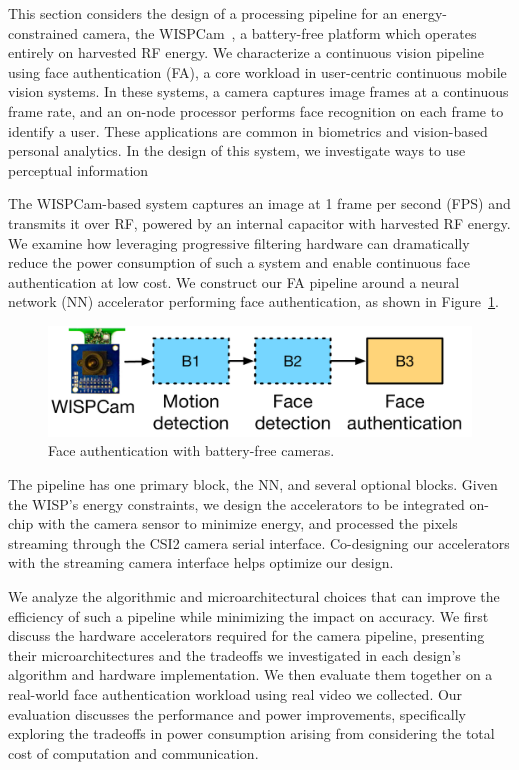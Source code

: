 
\label{sec:nsp-face-auth}

This section considers the design of a processing pipeline for an energy-constrained camera, the WISPCam~\cite{wispcam}, a battery-free platform which operates entirely on harvested RF energy.
We characterize a continuous vision pipeline using face authentication (FA), a core workload in user-centric continuous mobile vision systems.
In these systems, a camera captures image frames at a continuous frame rate, and an on-node processor performs face recognition on each frame to identify a user.
These applications are common in biometrics and vision-based personal analytics.
In the design of this system, we investigate ways to use perceptual information


The WISPCam-based system captures an image at 1 frame per second (FPS) and transmits it over RF, powered by an internal capacitor with harvested RF energy.
We examine how leveraging progressive filtering hardware can dramatically reduce the power consumption of such a system and enable continuous face authentication at low cost.
We construct our FA pipeline around a neural network (NN) accelerator performing face authentication, as shown in Figure~\ref{fig:face_recog_pipeline_solution}.


\begin{figure}[h]
\centering
    \begin{center}
\includegraphics[width=.4\textwidth]{nsp-figs/FA_pipeline_base_with_example.pdf}
    \end{center}
    \caption{Face authentication with battery-free cameras. }
    \label{fig:face_recog_pipeline_solution}
\end{figure}

The pipeline has one primary block, the NN, and several optional blocks.
Given the WISP's energy constraints, we design the accelerators to be integrated on-chip with the camera sensor to minimize energy, and processed the pixels streaming through the CSI2 camera serial interface.
Co-designing our accelerators with the streaming camera interface helps optimize our design.

We analyze the algorithmic and microarchitectural choices that can improve the efficiency of such a pipeline while minimizing the impact on accuracy.
We first discuss the hardware accelerators required for the camera pipeline, presenting their microarchitectures and the tradeoffs we investigated in each design's algorithm and hardware implementation.
We then evaluate them together on a real-world face authentication workload using real video we collected.
Our evaluation discusses the performance and power improvements, specifically exploring the tradeoffs in power consumption arising from considering the total cost of computation and communication.

